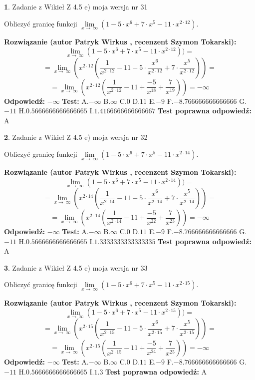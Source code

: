 \documentclass[12pt, a4paper]{article}
\theoremstyle{definition} %
\newtheorem{zad}{}
\newcommand{\zadStart}[1]{\begin{zad}#1\newline}
\newcommand{\zadStop}{\end{zad}}
\newcommand{\rozwStart}[2]{\noindent \textbf{Rozwiązanie (autor #1 , recenzent #2): }\newline}
\newcommand{\rozwStop}{\newline}
\newcommand{\odpStart}{\noindent \textbf{Odpowiedź:}\newline}
\newcommand{\odpStop}{\newline}
\newcommand{\testStart}{\noindent \textbf{Test:}\newline}
\newcommand{\testStop}{\newline}
\newcommand{\kluczStart}{\noindent \textbf{Test poprawna odpowiedź:}\newline}
\newcommand{\kluczStop}{\newline}
\begin{document}
\zadStart{Zadanie z Wikieł Z 4.5 e) moja wersja nr 31}


Obliczyć granicę funkcji  $\lim\limits_{x\to\ \infty}(1 - 5 \cdot x^{6}+7 \cdot x^{5}- 11 \cdot x^{2\cdot12})$.
\zadStop
\rozwStart{Patryk Wirkus}{Szymon Tokarski}
$$\lim\limits_{x\to\ \infty}(1 - 5 \cdot x^{6}+7 \cdot x^{5}- 11 \cdot x^{2\cdot12}))=$$
$$=\lim\limits_{x\to\ \infty}(x^{2\cdot12}(\frac{1}{x^{2\cdot12}}-11 -5 \cdot \frac{x^{6}}{x^{2\cdot12}}+7 \cdot \frac{x^{5}}{x^{2\cdot12}}))=$$
$$=\lim\limits_{x\to\ \infty}(x^{2\cdot12}(\frac{1}{x^{2\cdot12}}-11 + \frac{-5}{x^{18}}+ \frac{7}{x^{19}}))=-\infty$$
\rozwStop
\odpStart
$-\infty$
\odpStop
\testStart
A.$-\infty$ B.$\infty$ C.$0$ D.$11$ E.$-9$
F.$-8.766666666666666$ G.$-11$
H.$0.5666666666666665$
I.$1.4166666666666667$
\testStop
\kluczStart
A
\kluczStop



\zadStart{Zadanie z Wikieł Z 4.5 e) moja wersja nr 32}


Obliczyć granicę funkcji  $\lim\limits_{x\to\ \infty}(1 - 5 \cdot x^{6}+7 \cdot x^{5}- 11 \cdot x^{2\cdot14})$.
\zadStop
\rozwStart{Patryk Wirkus}{Szymon Tokarski}
$$\lim\limits_{x\to\ \infty}(1 - 5 \cdot x^{6}+7 \cdot x^{5}- 11 \cdot x^{2\cdot14}))=$$
$$=\lim\limits_{x\to\ \infty}(x^{2\cdot14}(\frac{1}{x^{2\cdot14}}-11 -5 \cdot \frac{x^{6}}{x^{2\cdot14}}+7 \cdot \frac{x^{5}}{x^{2\cdot14}}))=$$
$$=\lim\limits_{x\to\ \infty}(x^{2\cdot14}(\frac{1}{x^{2\cdot14}}-11 + \frac{-5}{x^{22}}+ \frac{7}{x^{23}}))=-\infty$$
\rozwStop
\odpStart
$-\infty$
\odpStop
\testStart
A.$-\infty$ B.$\infty$ C.$0$ D.$11$ E.$-9$
F.$-8.766666666666666$ G.$-11$
H.$0.5666666666666665$
I.$1.3333333333333335$
\testStop
\kluczStart
A
\kluczStop



\zadStart{Zadanie z Wikieł Z 4.5 e) moja wersja nr 33}


Obliczyć granicę funkcji  $\lim\limits_{x\to\ \infty}(1 - 5 \cdot x^{6}+7 \cdot x^{5}- 11 \cdot x^{2\cdot15})$.
\zadStop
\rozwStart{Patryk Wirkus}{Szymon Tokarski}
$$\lim\limits_{x\to\ \infty}(1 - 5 \cdot x^{6}+7 \cdot x^{5}- 11 \cdot x^{2\cdot15}))=$$
$$=\lim\limits_{x\to\ \infty}(x^{2\cdot15}(\frac{1}{x^{2\cdot15}}-11 -5 \cdot \frac{x^{6}}{x^{2\cdot15}}+7 \cdot \frac{x^{5}}{x^{2\cdot15}}))=$$
$$=\lim\limits_{x\to\ \infty}(x^{2\cdot15}(\frac{1}{x^{2\cdot15}}-11 + \frac{-5}{x^{24}}+ \frac{7}{x^{25}}))=-\infty$$
\rozwStop
\odpStart
$-\infty$
\odpStop
\testStart
A.$-\infty$ B.$\infty$ C.$0$ D.$11$ E.$-9$
F.$-8.766666666666666$ G.$-11$
H.$0.5666666666666665$
I.$1.3$
\testStop
\kluczStart
A
\kluczStop
\end{document}
